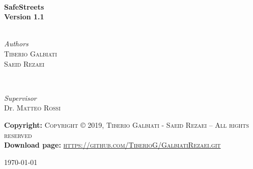 \begin{titlepage}
	\HRule\\[0.4cm]

	{\huge\bfseries SafeStreets}\\[0.4cm]
	\textbf{Version 1.1}\\

	\HRule\\[1.5cm]


	\begin{minipage}{0.4\textwidth}
		\begin{flushleft}
			\large
			\textit{Authors}\\
			 \textsc{Tiberio Galbiati} \\
			 \textsc{Saeid Rezaei}
		\end{flushleft}
	\end{minipage}
	~
	\begin{minipage}{0.4\textwidth}
		\begin{flushright}
			\large
			\textit{Supervisor}\\
			Dr. \textsc {Matteo Rossi}
		\end{flushright}
	\end{minipage}


\vfill\vfil
	\textbf{Copyright:} \textsc{ Copyright © 2019,  Tiberio Galbiati - Saeid Rezaei  – All rights reserved }\\[0.5cm]
	\textbf{Download page:} \textsc{ \url{https://github.com/TiberioG/GalbiatiRezaei.git} }\\[0.5cm]



	\vfill\vfill\vfill %

	{\large\today} %





	\vfill

\end{titlepage}






